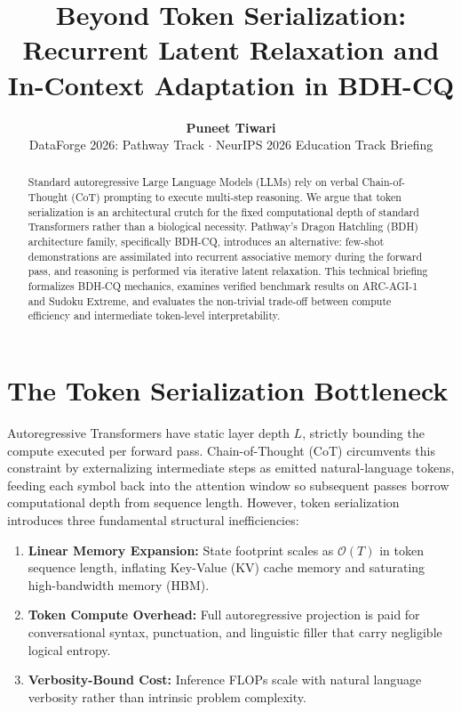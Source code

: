 \documentclass[9.5pt,a4paper]{article}
\title{\vspace{-1.4em}\textbf{\Large Beyond Token Serialization: Recurrent Latent Relaxation and In-Context Adaptation in BDH-CQ}\vspace{-0.6em}}
\author{\textbf{Puneet Tiwari} \\ \small DataForge 2026: Pathway Track \quad $\cdot$ \quad NeurIPS 2026 Education Track Briefing}
\date{\vspace{-2.0em}}
\begin{document}
\maketitle
\thispagestyle{empty}

\begin{abstract}
\vspace{-0.4em}
\noindent Standard autoregressive Large Language Models (LLMs) rely on verbal Chain-of-Thought (CoT) prompting to execute multi-step reasoning. We argue that token serialization is an architectural crutch for the fixed computational depth of standard Transformers rather than a biological necessity. Pathway's Dragon Hatchling (BDH) architecture family, specifically BDH-CQ, introduces an alternative: few-shot demonstrations are assimilated into recurrent associative memory during the forward pass, and reasoning is performed via iterative latent relaxation. This technical briefing formalizes BDH-CQ mechanics, examines verified benchmark results on ARC-AGI-1 and Sudoku Extreme, and evaluates the non-trivial trade-off between compute efficiency and intermediate token-level interpretability.
\vspace{-0.4em}
\end{abstract}

\vspace{-0.5em}
\section{The Token Serialization Bottleneck}
\vspace{-0.25em}
Autoregressive Transformers have static layer depth $L$, strictly bounding the compute executed per forward pass. Chain-of-Thought (CoT) circumvents this constraint by externalizing intermediate steps as emitted natural-language tokens, feeding each symbol back into the attention window so subsequent passes borrow computational depth from sequence length.
However, token serialization introduces three fundamental structural inefficiencies:
\begin{enumerate}
    \item \textbf{Linear Memory Expansion:} State footprint scales as $\mathcal{O}(T)$ in token sequence length, inflating Key-Value (KV) cache memory and saturating high-bandwidth memory (HBM).
    \item \textbf{Token Compute Overhead:} Full autoregressive projection is paid for conversational syntax, punctuation, and linguistic filler that carry negligible logical entropy.
    \item \textbf{Verbosity-Bound Cost:} Inference FLOPs scale with natural language verbosity rather than intrinsic problem complexity.
\end{enumerate}
\end{document}
